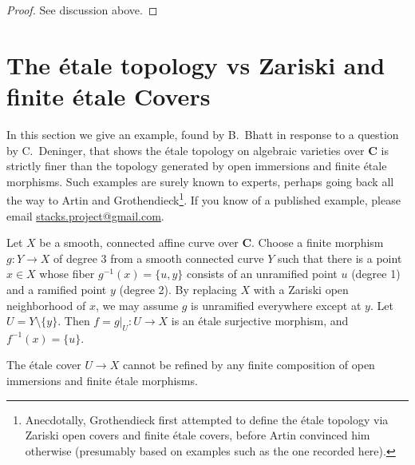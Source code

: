 \begin{proof}
See discussion above.
\end{proof}







\section{The \'etale topology vs Zariski and finite \'etale Covers}
\label{section-etale-zariski-finite-etale}

\noindent
In this section we give an example, found by B.~Bhatt in response
to a question by C.~Deninger, that shows the \'etale topology
on algebraic varieties over $\mathbf{C}$ is strictly finer than the
topology generated by open immersions and finite \'etale morphisms.
Such examples are surely known to experts, perhaps going back all the way
to Artin and Grothendieck\footnote{Anecdotally, Grothendieck first
attempted to define the \'etale topology via Zariski open covers and
finite \'etale covers, before Artin convinced him otherwise
(presumably based on examples such as the one recorded here).}.
If you know of a published example, please email
\href{mailto:stacks.project@gmail.com}{stacks.project@gmail.com}.

\medskip\noindent
Let $X$ be a smooth, connected affine curve over $\mathbf{C}$.
Choose a finite morphism $g: Y \to X$ of degree $3$ from
a smooth connected curve $Y$ such that there is a point $x \in X$
whose fiber $g^{-1}(x) = \{u, y\}$ consists of an unramified point
$u$ (degree 1) and a ramified point $y$ (degree 2). By replacing
$X$ with a Zariski open neighborhood of $x$, we may assume $g$
is unramified everywhere except at $y$. Let $U = Y \setminus \{y\}$.
Then $f=g|_U: U \to X$ is an \'etale surjective morphism, and
$f^{-1}(x) = \{u\}$. 

\begin{lemma}
\label{lemma-etale-not-dominated-zariski-finite-etale}
The \'etale cover $U \to X$ cannot be refined by any finite composition
of open immersions and finite \'etale morphisms.
\end{lemma}

